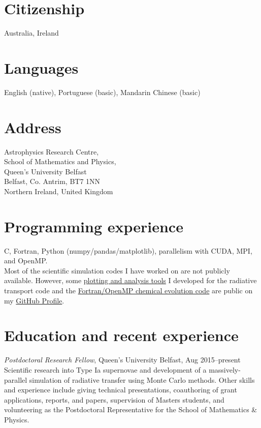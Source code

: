 \documentclass[11pt]{res} %
\begin{document}
\begin{resume}
\section{Citizenship}
  Australia, Ireland

\section{Languages}
  English (native), Portuguese (basic), Mandarin Chinese (basic)

\section{Address}
  Astrophysics Research Centre,\\
  School of Mathematics and Physics,\\
  Queen's University Belfast\\
  Belfast, Co. Antrim, BT7 1NN\\
  Northern Ireland, United Kingdom

\section{Programming experience}
  C, Fortran, Python (numpy/pandas/matplotlib), parallelism with CUDA, MPI, and OpenMP.\\
  Most of the scientific simulation codes I have worked on are not publicly available. However, some \href{https://github.com/lukeshingles/artistools}{plotting and analysis tools} I developed for the radiative transport code and the \href{https://github.com/lukeshingles/evelchemevol}{Fortran/OpenMP chemical evolution code} are public on my \href{https://github.com/lukeshingles}{GitHub Profile}.

\section{Education and recent experience}
  {\it Postdoctoral Research Fellow}, Queen's University Belfast, Aug 2015--present\\
  Scientific research into Type Ia supernovae and development of a massively-parallel simulation of radiative transfer using Monte Carlo methods. Other skills and experience include giving technical presentations, coauthoring of grant applications, reports, and papers, supervision of Masters students, and volunteering as the Postdoctoral Representative for the School of Mathematics \& Physics.


\end{resume}
\end{document}
